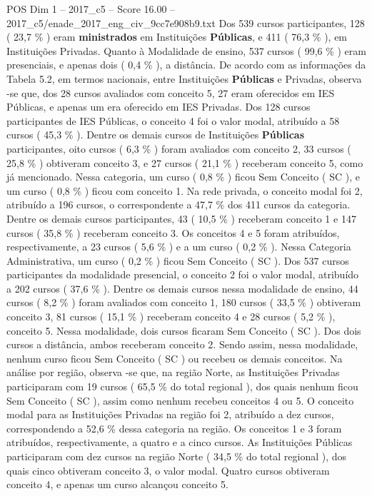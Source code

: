 \begin{textsample}{POS Dim 1 – 2017\_c5 – Score 16.00 – 2017\_c5/enade\_2017\_eng\_civ\_9cc7e908b9.txt}
Dos 539 cursos participantes, 128 ( 23,7 \% ) eram \textbf{ministrados} em Instituições \textbf{Públicas}, e 411 ( 76,3 \% ), em Instituições Privadas.
Quanto à Modalidade de ensino, 537 cursos ( 99,6 \% ) eram presenciais, e apenas dois ( 0,4 \% ), a distância.
De acordo com as informações da Tabela 5.2, em termos nacionais, entre Instituições \textbf{Públicas} e Privadas, observa -se que, dos 28 cursos avaliados com conceito 5, 27 eram oferecidos em IES Públicas, e apenas um era oferecido em IES Privadas.
Dos 128 cursos participantes de IES Públicas, o conceito 4 foi o valor modal, atribuído a 58 cursos ( 45,3 \% ).
Dentre os demais cursos de Instituições \textbf{Públicas} participantes, oito cursos ( 6,3 \% ) foram avaliados com conceito 2, 33 cursos ( 25,8 \% ) obtiveram conceito 3, e 27 cursos ( 21,1 \% ) receberam conceito 5, como já mencionado.
Nessa categoria, um curso ( 0,8 \% ) ficou Sem Conceito ( SC ), e um curso ( 0,8 \% ) ficou com conceito 1.
Na rede privada, o conceito modal foi 2, atribuído a 196 cursos, o correspondente a 47,7 \% dos 411 cursos da categoria.
Dentre os demais cursos participantes, 43 ( 10,5 \% ) receberam conceito 1 e 147 cursos ( 35,8 \% ) receberam conceito 3.
Os conceitos 4 e 5 foram atribuídos, respectivamente, a 23 cursos ( 5,6 \% ) e a um curso ( 0,2 \% ).
Nessa Categoria Administrativa, um curso ( 0,2 \% ) ficou Sem Conceito ( SC ).
Dos 537 cursos participantes da modalidade presencial, o conceito 2 foi o valor modal, atribuído a 202 cursos ( 37,6 \% ).
Dentre os demais cursos nessa modalidade de ensino, 44 cursos ( 8,2 \% ) foram avaliados com conceito 1, 180 cursos ( 33,5 \% ) obtiveram conceito 3, 81 cursos ( 15,1 \% ) receberam conceito 4 e 28 cursos ( 5,2 \% ), conceito 5.
Nessa modalidade, dois cursos ficaram Sem Conceito ( SC ).
Dos dois cursos a distância, ambos receberam conceito 2.
Sendo assim, nessa modalidade, nenhum curso ficou Sem Conceito ( SC ) ou recebeu os demais conceitos.
Na análise por região, observa -se que, na região Norte, as Instituições Privadas participaram com 19 cursos ( 65,5 \% do total regional ), dos quais nenhum ficou Sem Conceito ( SC ), assim como nenhum recebeu conceitos 4 ou 5.
O conceito modal para as Instituições Privadas na região foi 2, atribuído a dez cursos, correspondendo a 52,6 \% dessa categoria na região.
Os conceitos 1 e 3 foram atribuídos, respectivamente, a quatro e a cinco cursos.
As Instituições Públicas participaram com dez cursos na região Norte ( 34,5 \% do total regional ), dos quais cinco obtiveram conceito 3, o valor modal.
Quatro cursos obtiveram conceito 4, e apenas um curso alcançou conceito 5.

\end{textsample}
